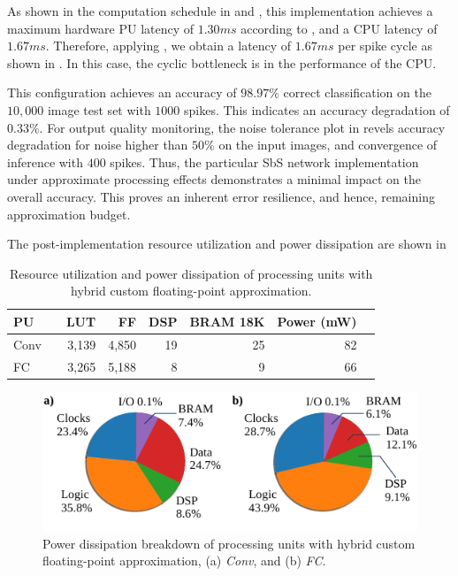 As shown in the computation schedule in  and , this implementation achieves a maximum hardware PU latency of $1.30 ms$ according to , and a CPU latency of $1.67 ms$. Therefore, applying , we obtain a latency of $1.67 ms$ per spike cycle as shown in . In this case, the cyclic bottleneck is in the performance of the CPU.

This configuration achieves an accuracy of $98.97\%$ correct classification on the $10,000$ image test set with $1000$ spikes. This indicates an accuracy degradation of $0.33\%$. For output quality monitoring, the noise tolerance plot in  revels accuracy degradation for noise higher than $50\%$ on the input images, and convergence of inference with $400$ spikes. Thus, the particular SbS network implementation under approximate processing effects demonstrates a minimal impact on the overall accuracy. This proves an inherent error resilience, and hence, remaining approximation budget.

The post-implementation resource utilization and power dissipation  are shown in  

\begin{table}[h!]\centering
	\caption{Resource utilization and power dissipation of processing units with hybrid custom floating-point approximation.}\label{tab:resource_cfp}
	\scriptsize
	\begin{tabular}{lrrrrrrr}\toprule
		\textbf{PU} & &\textbf{LUT} &\textbf{FF} &\textbf{DSP} &\textbf{BRAM 18K} &\textbf{Power (mW)} \\\midrule
		Conv & &3,139 &4,850 &19 &25 &82 \\
		FC & &3,265 &5,188 &8 &9 &66 \\
		\bottomrule
	\end{tabular}
\end{table}

\begin{figure}[!h]
	\centering
	\includegraphics[width=1\columnwidth]{../figures/power_dissipation_breakdown_float-5.pdf}
	\caption{Power dissipation breakdown of processing units with hybrid custom floating-point approximation, (a) \emph{Conv}, and (b) \emph{FC}.}
	\label{fig:power_dissipation_breakdown_float_5}
\end{figure}


